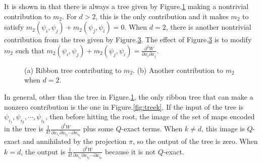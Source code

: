 \documentclass[a4paper,11pt]{article}
\numberwithin{equation}{section}
\begin{document}
It is shown in \cite{ballard2014derived} that there is always a tree given by 
Figure.\ref{fig:tree2_a} making a nontrivial contribution to $m_2$. For $d>2$, 
this is the only contribution and it makes $m_2$ to satisfy 
$m_2(\psi_i,\psi_j)+m_2(\psi_j,\psi_i)=0$. When $d=2$, there is another 
nontrivial contribution from the tree given by Figure.\ref{fig:tree2_b}. The 
effect of Figure.\ref{fig:tree2_b} is to modify $m_2$ such that 
$m_2(\psi_i,\psi_j)+m_2(\psi_j,\psi_i) = \frac{\partial^2 W}{\partial x_i 
\partial x_j}$.
\begin{figure}
\centering
 \begin{subfigure}[b]{0.5\textwidth}
 \caption{\qquad\qquad\qquad\qquad}\label{fig:tree2_a}
\end{subfigure}
\begin{subfigure}[b]{0.4\textwidth}
 \caption{\qquad\qquad}\label{fig:tree2_b}
\end{subfigure}
\caption{(a) Ribbon tree contributing to $m_2$. (b) Another contribution to $m_2$ when $d=2$.}
\end{figure}
In general, other than the tree in Figure.\ref{fig:tree2_a}, the only ribbon 
tree that can make a nonzero contribution is the one in Figure.\ref{fig:treek}. 
If the input of the tree is $\psi_{i_1},\psi_{i_2},\cdots,\psi_{i_k}$, then 
before hitting the root, the image of the set of maps encoded in the tree is 
$\frac{1}{k!}\frac{\partial^k W}{\partial x_{i_1}\partial x_{i_2}\cdots\partial 
x_{i_k}}$ plus some $Q$-exact terms. When $k \neq d$, this image is $Q$-exact 
and annihilated by the projection $\pi$, so the output of the tree is zero. When 
$k=d$, the output is $\frac{1}{k!}\frac{\partial^k W}{\partial x_{i_1}\partial 
x_{i_2}\cdots\partial x_{i_k}}$ because it is not $Q$-exact.    
\end{document}
